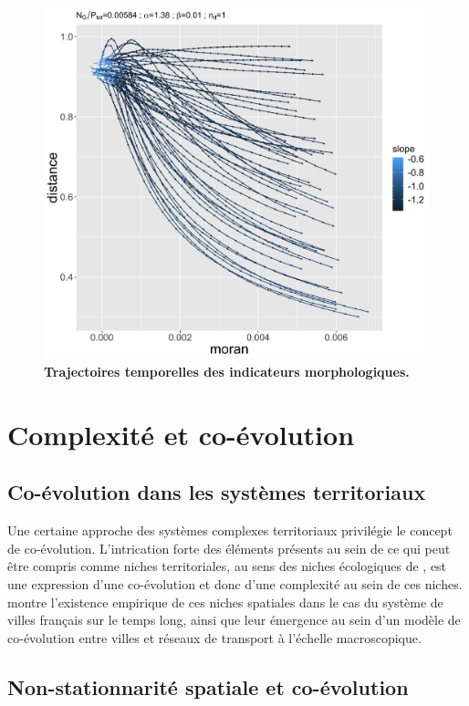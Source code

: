 \documentclass[11pt]{article}
\begin{document}
\begin{figure}
	\centering
	\includegraphics[width=0.7\linewidth]{figures/trajs_moran-dist_seed8578.png}
	\caption{\textbf{Trajectoires temporelles des indicateurs morphologiques.}}
	\label{fig:morphotraj}
\end{figure}





\section{Complexité et co-évolution}


\subsection{Co-évolution dans les systèmes territoriaux}

Une certaine approche des systèmes complexes territoriaux privilégie le concept de co-évolution. L'intrication forte des éléments présents au sein de ce qui peut être compris comme niches territoriales, au sens des niches écologiques de \cite{holland2012signals}, est une expression d'une co-évolution et donc d'une complexité au sein de ces niches. \cite{raimbault2018modeling} montre l'existence empirique de ces niches spatiales dans le cas du système de villes français sur le temps long, ainsi que leur émergence au sein d'un modèle de co-évolution entre villes et réseaux de transport à l'échelle macroscopique.


\subsection{Non-stationnarité spatiale et co-évolution}
\end{document}
